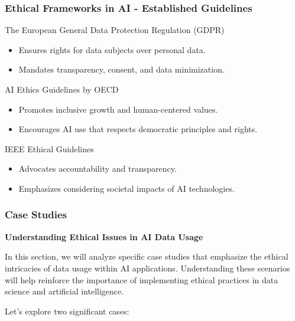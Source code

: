 \documentclass[aspectratio=169]{beamer}
\begin{document}
\begin{frame}[fragile]
    \frametitle{Ethical Frameworks in AI - Established Guidelines}
    \begin{block}{The European General Data Protection Regulation (GDPR)}
        \begin{itemize}
            \item Ensures rights for data subjects over personal data.
            \item Mandates transparency, consent, and data minimization.
        \end{itemize}
    \end{block}
    
    \begin{block}{AI Ethics Guidelines by OECD}
        \begin{itemize}
            \item Promotes inclusive growth and human-centered values.
            \item Encourages AI use that respects democratic principles and rights.
        \end{itemize}
    \end{block}
    
    \begin{block}{IEEE Ethical Guidelines}
        \begin{itemize}
            \item Advocates accountability and transparency.
            \item Emphasizes considering societal impacts of AI technologies.
        \end{itemize}
    \end{block}
\end{frame}

\begin{frame}[fragile]
    \frametitle{Case Studies}
    \textbf{Understanding Ethical Issues in AI Data Usage}

    In this section, we will analyze specific case studies that emphasize the ethical intricacies of data usage within AI applications. Understanding these scenarios will help reinforce the importance of implementing ethical practices in data science and artificial intelligence. 

    Let's explore two significant cases:
\end{frame}
\end{document}
